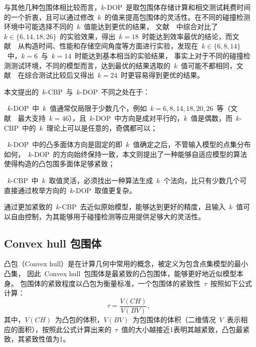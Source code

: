 与其他几种包围体相比较而言，$k$-DOP~是取包围体存储计算和相交测试耗费时间的一个折衷，且可以通过修改~$k$~的值来提高包围体的灵活性。在不同的碰撞检测环境中可能选择不同的~$k$~值能达到更优的结果，
文献~~中综合对比了~$k \in \{6,14,18,26\}$~的实验效果，得出~$k=18$~时能达到效率最优的结论，而文献~~从构造时间、性能和存储空间角度等方面进行实验，发现在~$k \in \{6,8,14\}$~中，$k=6$~与~$k=14$~时能达到基本相当的实验结果，
事实上对于不同的碰撞检测测试环境，不同的模型而言，达到最优的结果选取的~$k$~值可能不都相同，文献~~在综合测试比较后又得出~$k=24$~时更容易得到更优的结果。

本文提出的~$k$-CBP~与~$k$-DOP~不同之处在于：\\ \indent
\begin{inparaenum}[(1)]
\item ~$k$-DOP~中~$k$~值通常仅局限于少数几个，例如~$k=6,8,14,18,20,26$~等\cite{klosowski1998efficient}（文献~~最大支持~$k=46$），且~$k$-DOP~中方向是成对平行的，$k$~值是偶数，而~$k$-CBP~中的~$k$~理论上可以是任意的，奇偶都可以；\\ \indent
\item ~$k$-DOP~中的凸多面体方向是固定的即~$k$~值确定之后，不管输入模型的点集分布如何，~$k$-DOP~的方向始终保持一致，本文则提出了一种能够自适应模型的算法使得构造的凸包围多面体足够紧致；\\ \indent
\item ~$k$-CBP~中~$k$~取值灵活，必须找出一种算法生成~$k$~个法向，比只有少数几个可直接通过枚举方向的~$k$-DOP~取值更复杂。\\ \indent
\end{inparaenum} 
通过更加紧致的~$k$-CBP~去近似原始模型，能够达到更好的精度，且输入~$k$~值可以自由控制，为其能够用于碰撞检测等应用提供足够大的灵活性。

\subsection{Convex hull 包围体}
\label{subsec:convexhull}

凸包（Convex hull）是在计算几何中常用的概念，被定义为包含点集模型的最小凸集\cite{dengcg}，
因此~Convex hull~包围体是最紧致的凸包围体，能够更好地近似模型本身。
包围体的紧致程度以凸包为衡量标准，一个包围体的紧致性~$\tau$~按照如下公式计算：
\begin{equation}
\label{equa:judge:tightness}
\tau = \frac{V(CH)}{V(BV)},
\end{equation}
其中，$V(CH)$~为凸包的体积，$V(BV)$~为包围体的体积（二维情况~$V$~表示相应的面积），按照此公式计算出来的~$\tau$~值的大小越接近1表明其越紧致，凸包最紧致，其紧致性值为1。

